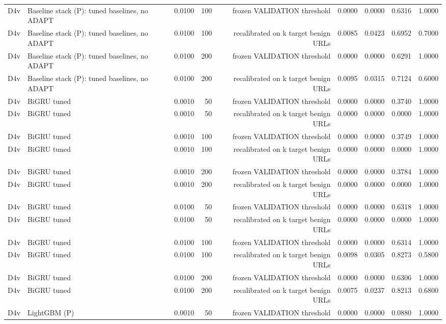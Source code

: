 \begin{table}[t]
\begin{tabular}{llrrrrrrr}
D4v & Baseline stack (P): tuned baselines, no ADAPT & 0.0100 & 100 & frozen VALIDATION threshold & 0.0000 & 0.0000 & 0.6316 & 1.0000 \\
D4v & Baseline stack (P): tuned baselines, no ADAPT & 0.0100 & 100 & recalibrated on k target benign URLs & 0.0085 & 0.0423 & 0.6952 & 0.7000 \\
D4v & Baseline stack (P): tuned baselines, no ADAPT & 0.0100 & 200 & frozen VALIDATION threshold & 0.0000 & 0.0000 & 0.6291 & 1.0000 \\
D4v & Baseline stack (P): tuned baselines, no ADAPT & 0.0100 & 200 & recalibrated on k target benign URLs & 0.0095 & 0.0315 & 0.7124 & 0.6000 \\
D4v & BiGRU tuned & 0.0010 & 50 & frozen VALIDATION threshold & 0.0000 & 0.0000 & 0.3740 & 1.0000 \\
D4v & BiGRU tuned & 0.0010 & 50 & recalibrated on k target benign URLs & 0.0000 & 0.0000 & 0.0000 & 1.0000 \\
D4v & BiGRU tuned & 0.0010 & 100 & frozen VALIDATION threshold & 0.0000 & 0.0000 & 0.3749 & 1.0000 \\
D4v & BiGRU tuned & 0.0010 & 100 & recalibrated on k target benign URLs & 0.0000 & 0.0000 & 0.0000 & 1.0000 \\
D4v & BiGRU tuned & 0.0010 & 200 & frozen VALIDATION threshold & 0.0000 & 0.0000 & 0.3784 & 1.0000 \\
D4v & BiGRU tuned & 0.0010 & 200 & recalibrated on k target benign URLs & 0.0000 & 0.0000 & 0.0000 & 1.0000 \\
D4v & BiGRU tuned & 0.0100 & 50 & frozen VALIDATION threshold & 0.0000 & 0.0000 & 0.6318 & 1.0000 \\
D4v & BiGRU tuned & 0.0100 & 50 & recalibrated on k target benign URLs & 0.0000 & 0.0000 & 0.0000 & 1.0000 \\
D4v & BiGRU tuned & 0.0100 & 100 & frozen VALIDATION threshold & 0.0000 & 0.0000 & 0.6314 & 1.0000 \\
D4v & BiGRU tuned & 0.0100 & 100 & recalibrated on k target benign URLs & 0.0098 & 0.0305 & 0.8273 & 0.5800 \\
D4v & BiGRU tuned & 0.0100 & 200 & frozen VALIDATION threshold & 0.0000 & 0.0000 & 0.6306 & 1.0000 \\
D4v & BiGRU tuned & 0.0100 & 200 & recalibrated on k target benign URLs & 0.0075 & 0.0237 & 0.8213 & 0.6800 \\
D4v & LightGBM (P) & 0.0010 & 50 & frozen VALIDATION threshold & 0.0000 & 0.0000 & 0.0880 & 1.0000 \\

\end{tabular}
\end{table}

